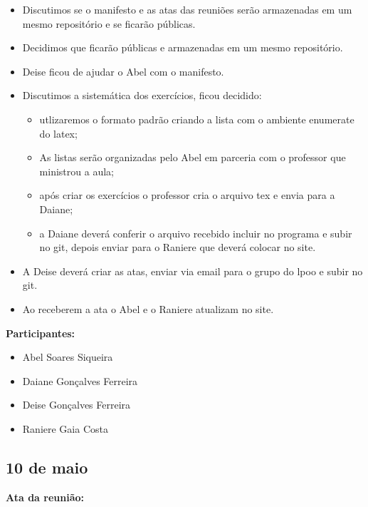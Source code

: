 \documentclass[12pt]{article}
\begin{document}
\begin{itemize}
\item Discutimos se o manifesto e as atas das reuni\~oes ser\~ao armazenadas em um mesmo reposit\'orio e se ficar\~ao p\'ublicas.
\item Decidimos que ficar\~ao p\'ublicas e armazenadas em um mesmo reposit\'orio.
\item Deise ficou de ajudar o Abel com o manifesto.
\item Discutimos a sistem\'atica dos exerc\'icios, ficou decidido:
\begin{itemize}
\item utlizaremos o formato padr\~ao criando a lista com o ambiente enumerate do latex;
\item As listas ser\~ao organizadas pelo Abel em parceria com o professor que mi\-nis\-trou a aula;
\item ap\'os criar os exerc\'icios o professor cria o arquivo tex e envia para a Daiane;
\item a Daiane dever\'a conferir o arquivo recebido incluir no programa e subir no git, depois enviar para o Raniere que dever\'a colocar no site.
\end{itemize}

\item A Deise dever\'a criar as atas, enviar via email para o grupo do lpoo e subir no git.
\item Ao receberem a ata o Abel e o Raniere atualizam no site.
 
\end{itemize}

{\bf{Participantes:}}

\begin{itemize}
\item Abel Soares Siqueira
\item Daiane Gon\c{c}alves Ferreira
\item Deise Gon\c{c}alves Ferreira
\item Raniere Gaia Costa
\end{itemize}

\subsection{10 de maio}

{\bf Ata da reuni\~ao:}
\end{document}

